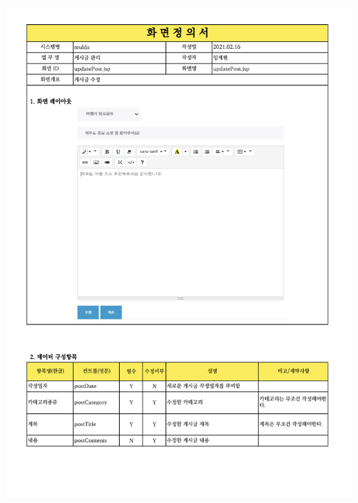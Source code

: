 {{{{{{{{{{{{{{{{{{{{{{{{{{{{{{{{{{{{{{{{{{{{{{{{{{{{{{{{{{{{{\includegraphics[width=20cm]{./Figure/Design/Display/post/post_09.pdf} \\
}}}}}}}}}}}}}}}}}}}}}}}}}}}}}}}}}}}}}}}}}}}}}}}}}}}}}}}}}}}}}
